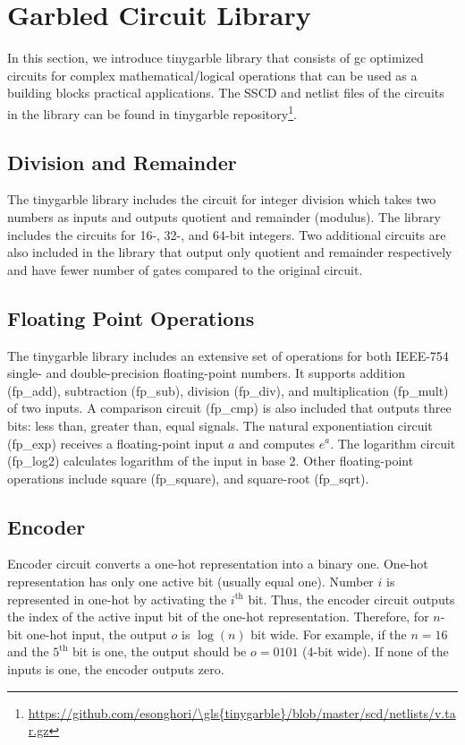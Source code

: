 \chapter{Garbled Circuit Library}\label{chap:library}
In this section, we introduce \gls{tinygarble} library that consists of \acrshort{gc} optimized circuits for complex mathematical/logical operations that can be used as a building blocks practical applications.
The SSCD and netlist files of the circuits in the library can be found in \gls{tinygarble} repository\footnote{\url{https://github.com/esonghori/\gls{tinygarble}/blob/master/scd/netlists/v.tar.gz}}.


\section{Division and Remainder}
The \gls{tinygarble} library includes the circuit for integer division which takes two numbers as inputs and outputs quotient and remainder (modulus).
The library includes the circuits for 16-, 32-, and 64-bit integers.
Two additional circuits are also included in the library that output only quotient and remainder respectively and have fewer number of gates compared to the original circuit.

\section{Floating Point Operations}
The \gls{tinygarble} library includes an extensive set of operations for both IEEE-754 single- and double-precision floating-point numbers.
It supports addition (fp\_add), subtraction (fp\_sub), division (fp\_div), and multiplication (fp\_mult) of two inputs.
A comparison circuit (fp\_cmp) is also included that outputs three bits: less than, greater than, equal signals.
The natural exponentiation circuit (fp\_exp) receives a floating-point input $a$ and computes $e^a$.
The logarithm circuit (fp\_log2) calculates logarithm of the input in base 2.
Other floating-point operations include square (fp\_square), and square-root (fp\_sqrt).

\section{Encoder}
Encoder circuit converts a one-hot representation into a binary one.
One-hot representation has only one active bit (usually equal one).
Number $i$ is represented in one-hot by activating the $i^{\text{th}}$ bit.
Thus, the encoder circuit outputs the index of the active input bit of the one-hot representation.
Therefore, for $n$-bit one-hot input, the output $o$ is $\log(n)$ bit wide.
For example, if the $n=16$ and the $5^{\text{th}}$ bit is one, the output should be $o=0101$ (4-bit wide).
If none of the inputs is one, the encoder outputs zero.

